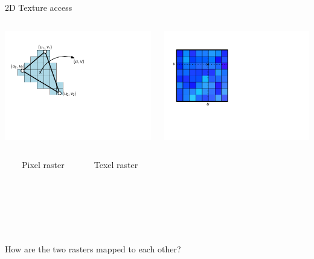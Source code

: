 \documentclass[utf8,stillsansserifmath,fleqn,t]{beamer}
\begin{document}
\begin{frame}[label=texture-mapping-general]
\frametitle{\insertsection}
2D Texture access
\begin{columns}
\centerline{\includegraphics[width=\textwidth]{./fig/texture-access-2d-1.pdf}}
\centerline{\includegraphics[width=.7\textwidth]{./fig/texture-access-2d-2.pdf}}
\end{columns}
\begin{columns}
~\\~\centerline{Pixel raster}
~\\~\centerline{Texel raster}
\end{columns}
~\\~\\~\centerline{How are the two rasters mapped to each other?}
\end{frame}
\end{document}
